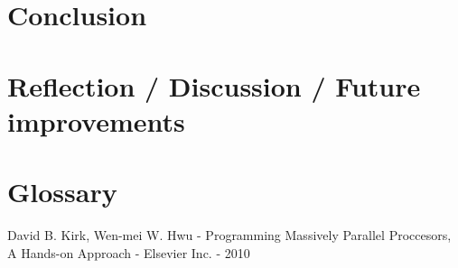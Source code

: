 \documentclass[12pt]{article}
\begin{document}
	
		
	\section{Conclusion}
	
	
	
	\section{Reflection / Discussion / Future improvements}
		
	
		
	\section{Glossary}
	
	
		
	\begin{thebibliography}{9}
	 David B. Kirk, Wen-mei W. Hwu - Programming Massively Parallel Proccesors, A Hands-on Approach - Elsevier Inc. - 2010
	\end{thebibliography}
	
\end{document}
